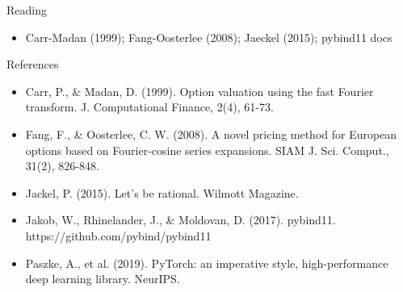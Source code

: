\documentclass[aspectratio=169,10pt]{beamer}
\begin{document}
\begin{frame}{Reading}
\begin{itemize}
  \item Carr-Madan (1999); Fang-Oosterlee (2008); Jaeckel (2015); pybind11 docs
\end{itemize}
\end{frame}

\begin{frame}{References}
\scriptsize\begin{itemize}\setlength{\itemsep}{3pt}
  \item Carr, P., \& Madan, D. (1999). Option valuation using the fast Fourier transform. J. Computational Finance, 2(4), 61-73.
  \item Fang, F., \& Oosterlee, C. W. (2008). A novel pricing method for European options based on Fourier-cosine series expansions. SIAM J. Sci. Comput., 31(2), 826-848.
  \item Jackel, P. (2015). Let's be rational. Wilmott Magazine.
  \item Jakob, W., Rhinelander, J., \& Moldovan, D. (2017). pybind11. https://github.com/pybind/pybind11
  \item Paszke, A., et al. (2019). PyTorch: an imperative style, high-performance deep learning library. NeurIPS.
\end{itemize}
\end{frame}
\end{document}
